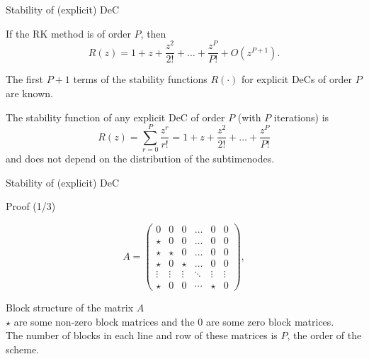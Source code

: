 \documentclass[aspectratio=169]{beamer}
\begin{document}
\begin{frame}{Stability of (explicit) DeC}
	
\begin{theorem}\label{th:RK_stab_functions}
	If the RK method is of order $P$, then\begin{equation}\label{eq:RK_order}
		R(z) = 1 + z + \frac{z^2}{2!} +\dots +\frac{z^P}{P!}+O(z^{P+1}).
	\end{equation}
\end{theorem}

The first $P+1$ terms of the stability functions $R(\cdot)$ for explicit DeCs of order $P$ are known.
\begin{theorem}\label{th:bDeC_equivalence} 
	The stability function of any explicit DeC of order $P$ (with $P$ iterations) is
	\begin{equation}
		R(z) = \sum_{r=0}^{P} \frac{z^r}{r!}= 1 + z + \frac{z^2}{2!} +\dots +\frac{z^P}{P!}
	\end{equation}
	and does not depend on the distribution of the subtimenodes.
\end{theorem}  
\end{frame}


\begin{frame}{Stability of (explicit) DeC}
	\begin{block}{Proof (1/3)}
				\begin{minipage}{0.4\textwidth}
			\begin{equation*}
			A= \begin{pmatrix}
				0 & 0 & 0&  \dots &0 &0\\
				\star & 0 & 0&  \dots & 0 &0\\
				\star & \star & 0 & \dots & 0 &0\\
				\star & 0& \star  & \dots & 0 &0\\
				\vdots & \vdots & \vdots &\ddots &\vdots&\vdots \\
				\star & 0 & 0 &\cdots   &\star &0
			\end{pmatrix},
		\end{equation*}
	\end{minipage}
	\begin{minipage}{0.55\textwidth}
		Block structure of the matrix $A$\\
		$\star$ are some non-zero block matrices and the 0 are some zero block matrices.\\
		The number of blocks in each line and row of these matrices is $P$, the order of the scheme.
	\end{minipage}
\end{block}

\end{frame}
\end{document}
